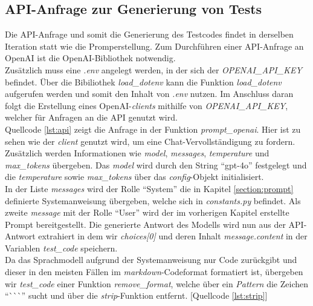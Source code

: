 \subsection{API-Anfrage zur Generierung von Tests}
Die API-Anfrage und somit die Generierung des Testcodes findet in derselben Iteration statt wie die Promperstellung. Zum Durchführen einer API-Anfrage an OpenAI ist die OpenAI-Bibliothek notwendig.\\ Zusätzlich muss eine \textit{.env} angelegt werden, in der sich der \textit{OPENAI\_API\_KEY} befindet. Über die Bibiliothek \textit{load\_dotenv} kann die Funktion \textit{load\_dotenv} aufgerufen werden und somit den Inhalt von \textit{.env} nutzen. Im Anschluss daran folgt die Erstellung eines OpenAI-\textit{clients} mithilfe von \textit{OPENAI\_API\_KEY}, welcher für Anfragen an die API genutzt wird. \\Quellcode \ref{lst:api} zeigt die Anfrage in der Funktion \textit{prompt\_openai}. Hier ist zu sehen wie der \textit{client} genutzt wird, um eine Chat-Vervollständigung zu fordern. \\
\vspace{-.3cm}
Zusätzlich werden Informationen wie \textit{model}, \textit{messages}, \textit{temperature} und \textit{max\_tokens} übergeben. Das \textit{model} wird durch den String ``gpt-4o'' festgelegt und die \textit{temperature} sowie \textit{max\_tokens} über das \textit{config}-Objekt initialisiert.\\ In der Liste \textit{messages} wird der Rolle ``System'' die in Kapitel \ref{section:prompt} definierte Systemanweisung übergeben, welche sich in \textit{constants.py} befindet. Als zweite \textit{message} mit der Rolle ``User'' wird der im vorherigen Kapitel erstellte Prompt bereitgestellt. Die generierte Antwort des Modells wird nun aus der API-Antwort extrahiert in dem wir \textit{choices[0]} und deren Inhalt \textit{message.content} in der Variablen \textit{test\_code} speichern.\\ Da das Sprachmodell aufgrund der 
Systemanweisung nur Code zurückgibt und dieser in den meisten Fällen im \textit{markdown}-Codeformat formatiert ist, übergeben wir \textit{test\_code} einer Funktion \textit{remove\_format}, welche über ein \textit{Pattern} die Zeichen ``\`{}\`{}\`{}'' sucht und über die \textit{strip}-Funktion entfernt. [Quellcode \ref{lst:strip}]\\
\vspace{-.3cm}

